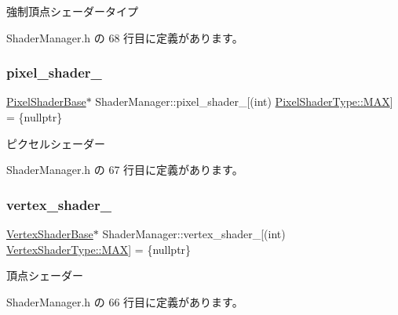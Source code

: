 強制頂点シェーダータイプ 



 Shader\+Manager.\+h の 68 行目に定義があります。

\mbox{\label{class_shader_manager_ad167380b7eed38c3f06e02f2f8eafe00}} 
\subsubsection{\texorpdfstring{pixel\+\_\+shader\+\_\+}{pixel\_shader\_}}
{\footnotesize\ttfamily \mbox{\hyperlink{class_pixel_shader_base}{Pixel\+Shader\+Base}}$\ast$ Shader\+Manager\+::pixel\+\_\+shader\+\_\+\mbox{[}(int) \mbox{\hyperlink{class_shader_manager_a7d15d773b3c6a99dd7086c45c8b0be5fa26a4b44a837bf97b972628509912b4a5}{Pixel\+Shader\+Type\+::\+M\+AX}}\mbox{]} = \{nullptr\}\hspace{0.3cm}{\ttfamily [private]}}



ピクセルシェーダー 



 Shader\+Manager.\+h の 67 行目に定義があります。

\mbox{\label{class_shader_manager_afdd04862a480ada5dc9f50ec1604e7f5}} 
\subsubsection{\texorpdfstring{vertex\+\_\+shader\+\_\+}{vertex\_shader\_}}
{\footnotesize\ttfamily \mbox{\hyperlink{class_vertex_shader_base}{Vertex\+Shader\+Base}}$\ast$ Shader\+Manager\+::vertex\+\_\+shader\+\_\+\mbox{[}(int) \mbox{\hyperlink{class_shader_manager_a9b51e49d70eb3cc58f6d1f3994e8cfbda26a4b44a837bf97b972628509912b4a5}{Vertex\+Shader\+Type\+::\+M\+AX}}\mbox{]} = \{nullptr\}\hspace{0.3cm}{\ttfamily [private]}}



頂点シェーダー 



 Shader\+Manager.\+h の 66 行目に定義があります。



